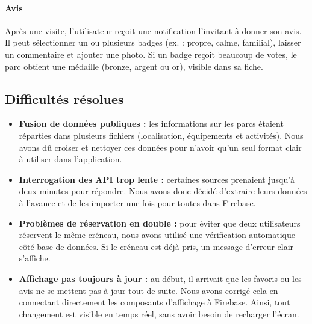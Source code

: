 \documentclass[12pt,a4paper]{article}
\begin{document}
\paragraph{Avis \\}
Après une visite, l'utilisateur reçoit une notification l'invitant à donner son avis. Il peut sélectionner un ou plusieurs badges (ex. : propre, calme, familial), laisser un commentaire et ajouter une photo.  
Si un badge reçoit beaucoup de votes, le parc obtient une médaille (bronze, argent ou or), visible dans sa fiche.

\subsection{Difficultés résolues}

\begin{itemize}
  \item \textbf{Fusion de données publiques :} les informations sur les parcs étaient réparties dans plusieurs fichiers (localisation, équipements et activités). Nous avons dû croiser et nettoyer ces données pour n'avoir qu'un seul format clair à utiliser dans l'application.
  
  \item \textbf{Interrogation des API trop lente :} certaines sources prenaient jusqu'à deux minutes pour répondre. Nous avons donc décidé d'extraire leurs données à l'avance et de les importer une fois pour toutes dans Firebase.

  \item \textbf{Problèmes de réservation en double :} pour éviter que deux utilisateurs réservent le même créneau, nous avons utilisé une vérification automatique côté base de données. Si le créneau est déjà pris, un message d'erreur clair s'affiche.

  \item \textbf{Affichage pas toujours à jour :} au début, il arrivait que les favoris ou les avis ne se mettent pas à jour tout de suite. Nous avons corrigé cela en connectant directement les composants d'affichage à Firebase. Ainsi, tout changement est visible en temps réel, sans avoir besoin de recharger l'écran.
\end{itemize}



\clearpage
\end{document}
